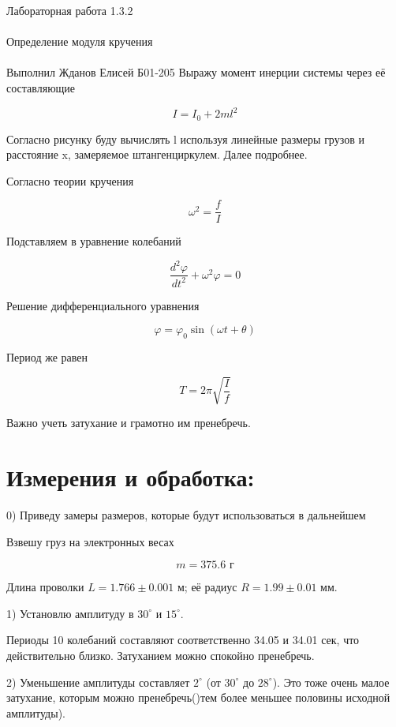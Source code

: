 \documentclass{astroedu-lab}
\begin{document}
\begin{problem}{\huge Лабораторная работа 1.3.2\\\\Определение модуля кручения\\\\Выполнил Жданов Елисей Б01-205}
Выражу момент инерции системы через её составляющие

\begin{equation}
	I = I_0 + 2 m l^2
\end{equation}

Согласно рисунку буду вычислять l используя линейные размеры грузов и расстояние x, замеряемое штангенциркулем. Далее подробнее.

Согласно теории кручения

\begin{equation}
	\omega^2 = \frac{f}{I}
\end{equation}

Подставляем в уравнение колебаний

\begin{equation}
	\frac{d^2 \varphi}{d t^2} + \omega^2 \varphi = 0
\end{equation}

Решение дифференциального уравнения

\begin{equation}
	\varphi = \varphi_0 \sin{\left(\omega t + \theta\right)}
\end{equation}

Период же равен

\begin{equation}
	T = 2 \pi \sqrt{\frac{I}{f}}
\end{equation}

Важно учеть затухание и грамотно им пренебречь.

\section{Измерения и обработка:}

0) Приведу замеры размеров, которые будут использоваться в дальнейшем

Взвешу груз на электронных весах

\begin{equation}
	m = 375.6 \text{ г}
\end{equation}

Длина проволки $L = 1.766 \pm 0.001$ м; её радиус $R = 1.99 \pm 0.01$ мм.



1) Установлю амплитуду в $30^\circ$ и $15^\circ$.

Периоды 10 колебаний составляют соответственно 34.05 и 34.01 сек, что действительно близко. Затуханием можно спокойно пренебречь.

2) Уменьшение амплитуды составляет $2^\circ $ (от $30^\circ$ до $28^\circ$). Это тоже очень малое затухание, которым можно пренебречь()тем более меньшее половины исходной амплитуды).


\end{problem}
\end{document}

